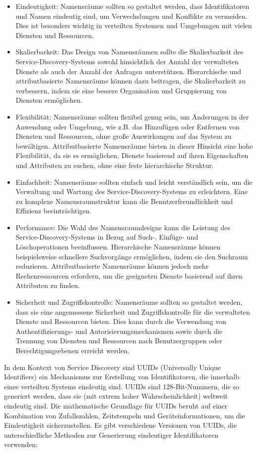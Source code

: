 \begin{itemize}
\item Eindeutigkeit: Namensräume sollten so gestaltet werden, dass Identifikatoren und Namen eindeutig sind, um Verwechslungen und Konflikte zu vermeiden. Dies ist besonders wichtig in verteilten Systemen und Umgebungen mit vielen Diensten und Ressourcen.
\item Skalierbarkeit: Das Design von Namensräumen sollte die Skalierbarkeit des Service-Discovery-Systems sowohl hinsichtlich der Anzahl der verwalteten Dienste als auch der Anzahl der Anfragen unterstützen. Hierarchische und attributbasierte Namensräume können dazu beitragen, die Skalierbarkeit zu verbessern, indem sie eine bessere Organisation und Gruppierung von Diensten ermöglichen.
\item Flexibilität: Namensräume sollten flexibel genug sein, um Änderungen in der Anwendung oder Umgebung, wie z.B. das Hinzufügen oder Entfernen von Diensten und Ressourcen, ohne große Auswirkungen auf das System zu bewältigen. Attributbasierte Namensräume bieten in dieser Hinsicht eine hohe Flexibilität, da sie es ermöglichen, Dienste basierend auf ihren Eigenschaften und Attributen zu suchen, ohne eine feste hierarchische Struktur.
\item Einfachheit: Namensräume sollten einfach und leicht verständlich sein, um die Verwaltung und Wartung des Service-Discovery-Systems zu erleichtern. Eine zu komplexe Namensraumstruktur kann die Benutzerfreundlichkeit und Effizienz beeinträchtigen.
\item Performance: Die Wahl des Namensraumdesigns kann die Leistung des Service-Discovery-Systems in Bezug auf Such-, Einfüge- und Löschoperationen beeinflussen. Hierarchische Namensräume können beispielsweise schnellere Suchvorgänge ermöglichen, indem sie den Suchraum reduzieren. Attributbasierte Namensräume können jedoch mehr Rechenressourcen erfordern, um die geeigneten Dienste basierend auf ihren Attributen zu finden.
\item Sicherheit und Zugriffskontrolle: Namensräume sollten so gestaltet werden, dass sie eine angemessene Sicherheit und Zugriffskontrolle für die verwalteten Dienste und Ressourcen bieten. Dies kann durch die Verwendung von Authentifizierungs- und Autorisierungsmechanismen sowie durch die Trennung von Diensten und Ressourcen nach Benutzergruppen oder Berechtigungsebenen erreicht werden.
\end{itemize}
In dem Kontext von Service Discovery sind UUIDs (Universally Unique Identifiers) ein Mechanismus zur Erstellung von Identifikatoren, die innerhalb eines verteilten Systems eindeutig sind. UUIDs sind 128-Bit-Nummern, die so generiert werden, dass sie (mit extrem hoher Wahrscheinlichkeit) weltweit eindeutig sind. Die mathematische Grundlage für UUIDs beruht auf einer Kombination von Zufallszahlen, Zeitstempeln und Geräteinformationen, um die Eindeutigkeit sicherzustellen.
Es gibt verschiedene Versionen von UUIDs, die unterschiedliche Methoden zur Generierung eindeutiger Identifikatoren verwenden:

